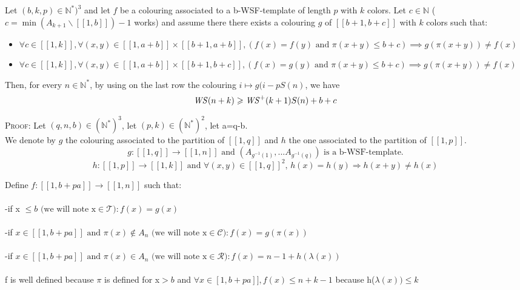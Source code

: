 \begin{proposition}
Let \((b, k, p) \in \mathbb{N}^*)^3\) and let \(f\) be a colouring associated to a b-WSF-template of length \(p\) with \(k\) colors. Let
\(c \in \mathbb{N}\) (\(c = \min (A_{k+1} \backslash [\![1, b ]\!]) - 1\) works) and assume there there exists a colouring \(g\) of
\([\![b + 1, b + c]\!]\) with \(k\) colors such that:
\begin{itemize}
	\item \(\forall c \in [\![1, k]\!], \forall (x, y) \in  [\![1, a + b]\!] \times  [\![b + 1, a + b]\!], (f(x) = f(y) \text{ and } \pi(x + y) \leqslant b + c)
	\implies g(\pi(x + y)) \neq f(x)\)
	\item \(\forall c \in [\![1, k]\!], \forall (x, y) \in  [\![1, a + b]\!] \times  [\![b + 1, b + c]\!],  (f(x) = g(y) \text{ and } \pi(x + y) \leqslant b + c)
\implies g(\pi(x + y)) \neq f(x)\)
\end{itemize}
Then, for every \(n \in \mathbb{N}^*\), by using on the last row the colouring \(i \longmapsto g(i - p S(n)\), we have\\
\[ \mathit{WS}(n+k) \geqslant \mathit{WS}^+(k+1) S(n) + b + c\]
\end{proposition}

\textsc{Proof:} Let \((q,n,b) \in (\mathbb{N}^*)^3\), let \( (p,k) \in (\mathbb{N}^*)^2\), let a=q-b. \\
We denote by \(g\) the colouring associated to the partition of \([\![1,q]\!]\) and \(h\) the
one associated to the partition of \([\![1,p]\!]\).
\[ g : [\![1,q]\!] \longrightarrow [\![1,n]\!] \text{ and } (A_{g^{-1}(1)},...A_{g^{-1}(q)})\text{ is a b-WSF-template.}
\]
\[h : [\![1,p]\!] \longrightarrow [\![1,k]\!] \text{ and } \forall (x,y) \in [\![1,q]\!]^2 \text{, } h(x) = h(y)
\Longrightarrow h(x+y) \neq h(x)
\]

Define \( f : [\![1,b+pa]\!] \longrightarrow [\![1,n]\!] \) such that:
\\\\-if x \(\leqslant b \text{ (we will note x} \in \mathcal{T}): f(x)=g(x)\)
\\\\-if \( x \in [\![1,b+pa]\!] \text{ and } \pi(x) \notin A_n \text{ (we will note x} \in \mathcal{C}): f(x)=g(\pi(x))\)
\\\\-if \( x \in [\![1,b+pa]\!]  \text{ and }\pi(x) \in A_n \text{ (we will note x} \in \mathcal{R}): f(x)=n-1+h(\lambda(x))\)
\\\\
f is well defined because \(\pi\) is defined for x\(>b\) and \(\forall x \in \![1,b+pa]\!], f(x)\leqslant n+k-1\) because h(\(\lambda(x))\leqslant k\)

